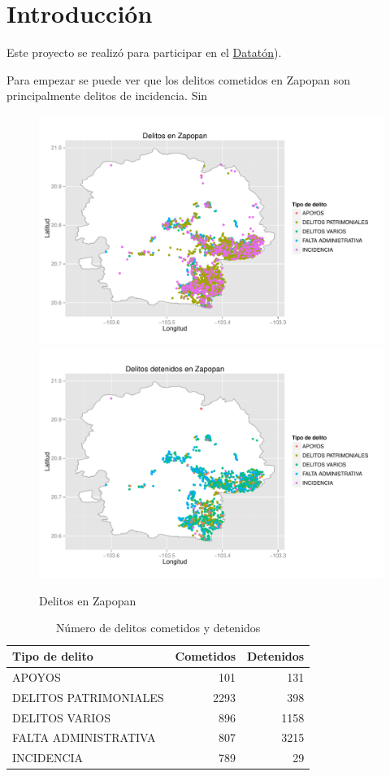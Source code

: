 \newpage
\chapter{Introducción}

\noindent  Este proyecto se realizó para participar en el \href{http://http://dataton.datos.gob.mx}{Datatón}).

Para empezar se puede ver que los delitos cometidos en Zapopan son principalmente delitos de incidencia. Sin 


\begin{figure}[h]
\centering
\caption{Delitos en Zapopan}
\includegraphics[width=120mm]{../../graphs/zapopan_delitos.pdf}
\includegraphics[width=120mm]{../../graphs/zapopan_delitos_detenidos.pdf}
\end{figure}


\begin{table}[h]
\centering
\caption{Número de delitos cometidos y detenidos} 
\begin{tabular}{lrr}
  \hline
Tipo de delito & Cometidos & Detenidos \\ 
  \hline
APOYOS & 101 & 131 \\ 
  DELITOS PATRIMONIALES & 2293 & 398 \\ 
  DELITOS VARIOS & 896 & 1158 \\ 
  FALTA ADMINISTRATIVA & 807 & 3215 \\ 
  INCIDENCIA & 789 &  29 \\ 
   \hline
\end{tabular}
\end{table}

